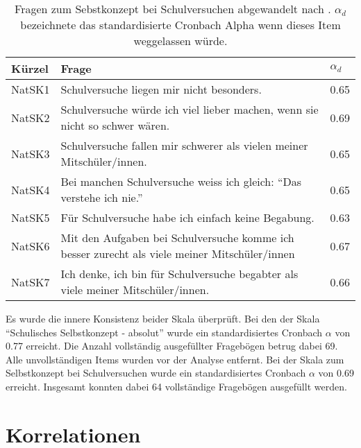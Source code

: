 \begin{table}[htbp]
  \centering
\begin{tabular}{|p{2cm}|p{10cm}|p{1cm}|}
\hline Kürzel & Frage & $\alpha_d$  \\ 
\hline NatSK1 & Schulversuche liegen mir nicht besonders. &  0.65  \\ 
\hline NatSK2 & Schulversuche würde ich viel lieber machen, wenn sie nicht so schwer wären.  &  0.69 \\ 
\hline NatSK3 & Schulversuche fallen mir schwerer als vielen meiner Mitschüler/innen. &  0.65  \\ 
\hline NatSK4 & Bei manchen Schulversuche weiss ich gleich: "`Das verstehe ich nie."' &  0.65   \\ 
\hline NatSK5 & Für Schulversuche habe ich einfach keine Begabung.   & 0.63   \\ 
\hline NatSK6 & Mit den Aufgaben bei Schulversuche komme ich besser zurecht als viele meiner Mitschüler/innen  & 0.67   \\ 
\hline NatSK7 & Ich denke, ich bin für Schulversuche begabter als viele meiner Mitschüler/innen.  & 0.66   \\ 
\hline 
\end{tabular} 

  \caption{Fragen zum Sebstkonzept bei Schulversuchen abgewandelt nach \citet{Dierks2014}. $\alpha_d$ bezeichnete das standardisierte Cronbach Alpha wenn dieses Item weggelassen würde.}
  \label{tab:NatSK}
\end{table}

Es wurde die innere Konsistenz beider Skala überprüft. Bei den der Skala "`Schulisches Selbstkonzept - absolut"' wurde ein standardisiertes Cronbach $\alpha$ von 0.77 erreicht. Die Anzahl vollständig ausgefüllter Fragebögen betrug dabei 69. Alle unvollständigen Items wurden vor der Analyse entfernt. Bei der Skala zum Selbstkonzept bei Schulversuchen wurde ein standardisiertes Cronbach $\alpha$ von 0.69 erreicht. Insgesamt konnten dabei 64 vollständige Fragebögen ausgefüllt werden. 


\section{Korrelationen}




